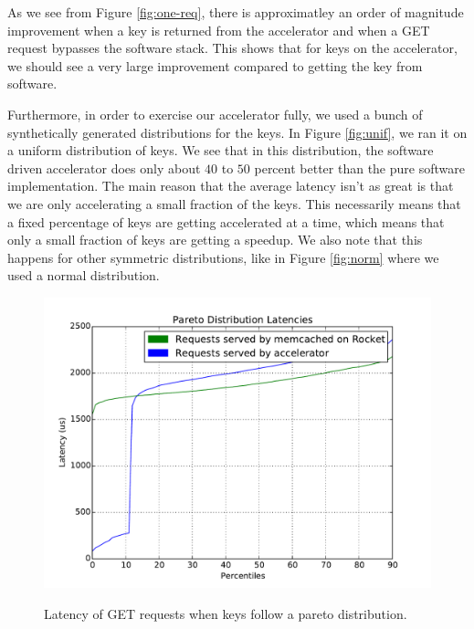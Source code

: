 As we see from Figure \ref{fig:one-req}, there is approximatley an order of magnitude
improvement when a key is returned from the accelerator and when a GET request
bypasses the software stack. This shows that for keys on the accelerator, we
should see a very large improvement compared to getting the key from software.

Furthermore, in order to exercise our accelerator fully, we used a bunch of
synthetically generated distributions for the keys. In Figure \ref{fig:unif},
we ran it on a uniform distribution of keys. We see that in this distribution,
the software driven accelerator does only about $40$ to $50$ percent better
than the pure software implementation. The main reason that the average latency
isn't as great is that we are only accelerating a small fraction of the keys.
This necessarily means that a fixed percentage of keys are getting accelerated
at a time, which means that only a small fraction of keys are getting a
speedup. We also note that this happens for other symmetric distributions, like
in Figure \ref{fig:norm} where we used a normal distribution.

\begin{figure}[t]
\begin{center}
\label{fig:pareto}
\includegraphics[width=\linewidth]{pareto.pdf}
\caption{Latency of GET requests when keys follow a pareto distribution.}
\end{center}
\end{figure}

